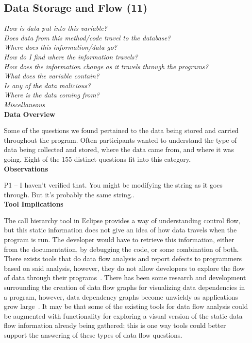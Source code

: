 \documentclass[conference]{IEEEtran}
\begin{document}

\noindent\subsection{\textbf{Data Storage and Flow (11)}}\label{dsf}

\noindent\emph{How is data put into this variable?} \\
\emph{Does data from this method/code travel to the database?} \\
\emph{Where does this information/data go?} \\
\emph{How do I find where the information travels?} \\
\emph{How does the information change as it travels through the programs?} \\
\emph{What does the variable contain?} \\
\emph{Is any of the data malicious?} \\
\emph{Where is the data coming from?} \\
\emph{Miscellaneous} \\

\noindent\textbf{Data Overview}

Some of the questions we found pertained to the data being stored and carried throughout the program. 
Often participants wanted to understand  the type of data being collected and stored, where the data came from, and where it was going. 
Eight of the 155 distinct questions fit into this category.
\\

\noindent\textbf{Observations}

P1 -- I haven't verified that. You might be modifying the string as it goes through. But it's probably the same string.. 
\\

\noindent\textbf{Tool Implications}

The call hierarchy tool in Eclipse provides a way of understanding control flow, but this static information does not give an idea of how data travels when the program is run. 
The developer would have to retrieve this information, either from the documentation, by debugging the code, or some combination of both. 
There exists tools that do data flow analysis and report defects to programmers based on said analysis, however, they do not allow developers to explore the flow of data through their programs~\cite{jovanovic2006pixy}. 
There has been some research and development surrounding the creation of data flow graphs for visualizing data dependencies in a program, however, data dependency graphs become unwieldy as applications grow large~\cite{ghosh2001method, ferrante1987program}. 
It may be that some of the existing tools for data flow analysis could be augmented with functionality for exploring a visual version of the static data flow information already being gathered; this is one way tools could better support the answering of these types of data flow questions.
\\
\end{document}
